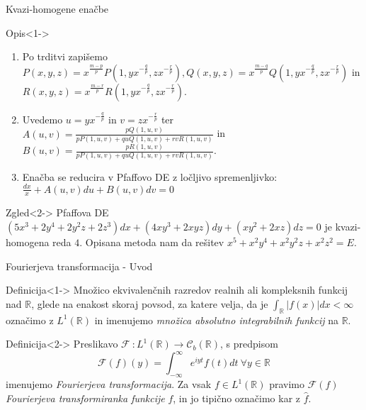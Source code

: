 \documentclass[t, 8pt]{beamer} %
\newcommand{\abs}[1]{\ensuremath{\lvert #1 \rvert}}
\newcommand{\mth}[1]{\ensuremath{\mathbb{#1}}}
\newcommand{\R}{\mth{R}}
\newcommand{\pojem}[1]{\emph{#1}}
\newcommand{\map}[3]{\ensuremath{{#1}~: {#2} \rightarrow {#3}}}
\newcommand{\fillblack}[1]{
	\begin{tikzpicture}[remember picture, overlay]
		\node [shift={(0 cm,0cm)}]  at (current page.south west)
		{%
			\begin{tikzpicture}[remember picture, overlay] at (current page.south west)
				\draw [fill=black] (0, 0) -- (0,#1 \paperheight) --
				(\paperwidth,#1 \paperheight) -- (\paperwidth,0) -- cycle ;
			\end{tikzpicture}
		};
		\draw (current page.north west) rectangle (current page.south east);
	\end{tikzpicture}
}
\begin{document}
		\begin{frame}{Kvazi-homogene enačbe}
			\begin{block}{Opis}<1->
				\begin{enumerate}
					\item Po trditvi zapišemo
						$P(x, y, z) = x^{\frac{m-p}{p}}P(1, yx^{-\frac{q}{p}}, zx^{-\frac{r}{p}}),
						Q(x, y, z) = x^{\frac{m-q}{p}}Q(1, yx^{-\frac{q}{p}}, zx^{-\frac{r}{p}})$ in
						$R(x, y, z) = x^{\frac{m-r}{p}}R(1, yx^{-\frac{q}{p}}, zx^{-\frac{r}{p}})$.
					\item Uvedemo $u = yx^{-\frac{q}{p}}$ in $v = zx^{-\frac{r}{p}}$ ter $A(u, v) = \frac{pQ(1, u, v)}{pP(1, u, v) + quQ(1, u, v) + rvR(1, u, v)}$ in $B(u, v) = \frac{pR(1, u, v)}{pP(1, u, v) + quQ(1, u, v) + rvR(1, u, v)}$.
					\item Enačba se reducira v Pfaffovo DE z ločljivo spremenljivko: $\frac{dx}{x} + A(u, v)du + B(u, v)dv = 0$
				\end{enumerate}
			\end{block}
			
			\begin{block}{Zgled}<2->
				Pfaffova DE $(5x^3 + 2y^4 + 2y^2z + 2z^3)dx + (4xy^3 + 2xyz)dy + (xy^2 + 2xz)dz = 0$ je kvazi-homogena reda $4$. Opisana metoda nam da rešitev $x^5 + x^2y^4 + x^2y^2z + x^2z^2 = E$.
			\end{block}
		\end{frame}
		
		\begin{frame}{Fourierjeva transformacija - Uvod}
			
			\begin{block}{Definicija}<1->
				Množico ekvivalenčnih razredov realnih ali kompleksnih funkcij nad $\R$, glede na enakost skoraj povsod, za katere velja, da je $\int_{\R}\abs{f(x)} dx < \infty$ označimo z $L^1(\R)$ in imenujemo \pojem{množica absolutno integrabilnih funkcij} na $\R$.
			\end{block}
			\begin{block}{Definicija}<2->
					Preslikavo $\map{\mathcal{F}}{L^1(\R)}{\mathcal{C}_b(\R)}$, s predpisom $$\mathcal{F}(f)(y) = \int_{-\infty}^{\infty}e^{iyt}f(t)dt~\forall y\in\R$$ imenujemo \pojem{Fourierjeva transformacija}. Za vsak $f\in L^1(\R)$ pravimo $\mathcal{F}(f)$ \pojem{Fourierjeva transformiranka funkcije} $f$, in jo tipično označimo kar z $\hat{f}$.
			\end{block}
		\end{frame}
		
\end{document}
